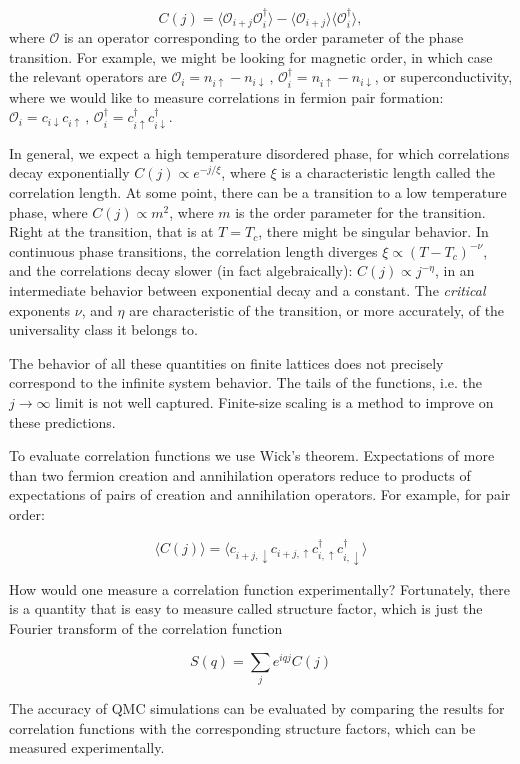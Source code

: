 \begin{equation}
C(j) = \big\langle \mathcal{O}_{i+j} \mathcal{O}_{i}^\dagger \big\rangle - \langle \mathcal{O}_{i+j} \big\rangle\big\langle\mathcal{O}_{i}^\dagger \big\rangle ,
\end{equation}
where $\mathcal{O}$ is an operator corresponding to the order parameter of the phase transition. For example, we might be looking for magnetic order, in which case the relevant operators are $\mathcal{O}_i = n_{i\uparrow} - n_{i\downarrow} \, , \, \mathcal{O}_i^\dagger = n_{i\uparrow} - n_{i\downarrow}$, or superconductivity, where we would like to measure correlations in fermion pair formation: $\mathcal{O}_i = c_{i\downarrow} c_{i\uparrow} \, , \, \mathcal{O}_i^\dagger = c_{i\uparrow}^\dagger c_{i\downarrow}^\dagger$.

In general, we expect a high temperature disordered phase, for which correlations decay exponentially $C(j) \propto e^{-j/\xi}$, where $\xi$ is a characteristic length called the correlation length. At some point, there can be a transition to a low temperature phase, where $C(j) \propto m^2$, where $m$ is the order parameter for the transition. Right at the transition, that is at $T = T_c$, there might be singular behavior. In continuous phase transitions, the correlation length diverges $\xi \propto (T-T_c)^{-\nu}$, and the correlations decay slower (in fact algebraically): $C(j) \propto j^{-\eta}$, in an intermediate behavior between exponential decay and a constant. The \emph{critical} exponents $\nu$, and $\eta$ are characteristic of the transition, or more accurately, of the universality class it belongs to.

The behavior of all these quantities on finite lattices does not precisely correspond to the infinite system behavior. The tails of the functions, i.e. the $j\rightarrow \infty$ limit is not well captured. Finite-size scaling is a method to improve on these predictions.

To evaluate correlation functions we use Wick's theorem. Expectations of more than two fermion creation and annihilation operators reduce to products of expectations of pairs of creation and annihilation operators. For example, for pair order:

\begin{equation}
\big\langle C(j) \big\rangle = \big\langle c_{i+j, \downarrow} c_{i+j, \uparrow} c_{i, \uparrow}^\dagger c_{i, \downarrow}^\dagger \big\rangle
\end{equation}

How would one measure a correlation function experimentally? Fortunately, there is a quantity that is easy to measure called structure factor, which is just the Fourier transform of the correlation function

\begin{equation}
S(q) = \sum_j e^{iqj} C(j) 
\end{equation}

The accuracy of QMC simulations can be evaluated by comparing the results for correlation functions with the corresponding structure factors, which can be measured experimentally.